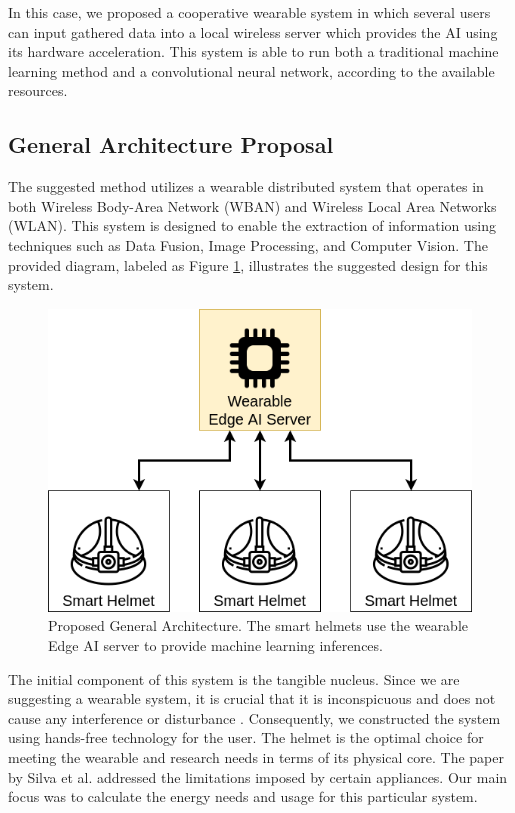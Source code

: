In this case, we proposed a cooperative wearable system in which several users can input gathered data into a local wireless server which provides the AI using its hardware acceleration. This system is able to run both a traditional machine learning method and a convolutional neural network, according to the available resources.

\subsection{General Architecture Proposal}

The suggested method utilizes a wearable distributed system that operates in both Wireless Body-Area Network (WBAN) and Wireless Local Area Networks (WLAN). This system is designed to enable the extraction of information using techniques such as Data Fusion, Image Processing, and Computer Vision. The provided diagram, labeled as Figure \ref{fig:architecture}, illustrates the suggested design for this system.

\begin{figure}[h!]
\centering
\includegraphics[width = .6\linewidth]{Figures/dataflow-2.png}
\caption{\label{fig:architecture}Proposed General Architecture. The smart helmets use the wearable Edge AI server to provide machine learning inferences.}
\end{figure}

The initial component of this system is the tangible nucleus. Since we are suggesting a wearable system, it is crucial that it is inconspicuous and does not cause any interference or disturbance \cite{bonato2003wearable}. Consequently, we constructed the system using hands-free technology for the user. The helmet is the optimal choice for meeting the wearable and research needs in terms of its physical core. The paper by Silva et al. \cite{silva2019toward} addressed the limitations imposed by certain appliances. Our main focus was to calculate the energy needs and usage for this particular system.

